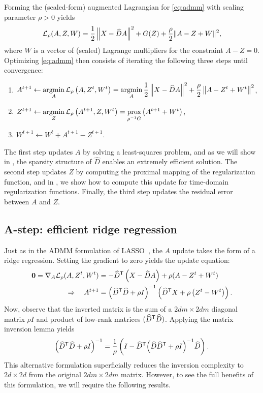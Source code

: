 \documentclass{article} %
\begin{document}
Forming the (scaled-form) augmented Lagrangian for \eqref{eq:admm} with scaling
parameter $\rho > 0 $ yields
\[
\mathcal{L}_\rho(A,Z,W) = \frac{1}{2}\left\|X - \widehat{D}A\right\|^2 + G(Z) +
\frac{\rho}{2}\|A - Z + W\|^2,
\]
where $W$ is a vector of (scaled) Lagrange multipliers for the constraint $A-Z=0$.
Optimizing \eqref{eq:admm} then consists of iterating the following three steps until
convergence:
\begin{enumerate}
\item $\displaystyle A^{t+1} \leftarrow \operatorname*{argmin}_A \mathcal{L}_\rho\left(A, Z^t, W^t\right) = \operatorname*{argmin}_A \frac{1}{2}
\left\|X - \widehat{D}A\right\|^2 + \frac{\rho}{2}\left\|A - Z^t + W^t\right\|^2$,
\item $\displaystyle Z^{t+1} \leftarrow \operatorname*{argmin}_Z \mathcal{L}_\rho\left(A^{t+1}, Z, W^t\right) =
\operatorname*{prox}_{\rho^{-1}G}\left(A^{t+1} + W^t \right)$,
\item $W^{t+1} \leftarrow W^t + A^{t+1} - Z^{t+1}$.
\end{enumerate}

The first step updates $A$ by solving a least-squares problem, and as we will show in
, the sparsity structure of $\widehat{D}$ enables an extremely
efficient solution.  The second step updates $Z$ by computing the proximal mapping of
the regularization function, and in , we show how to compute this
update for time-domain regularization functions.  Finally, the third step updates the
residual error between $A$ and $Z$.

\subsection{A-step: efficient ridge regression}
\label{sec:astep}
Just as in the ADMM formulation of LASSO~\cite[chapter 6.4]{boyd2011}, the $A$ update 
takes the form of a ridge regression.  Setting the gradient to zero yields the update
equation:
\begin{align}
\mathbf{0} = \nabla_A \mathcal{L}_\rho(A, Z^t, W^t) &= -\widehat{D}^\mathsf{T} \left(X - \widehat{D}A\right)
+ \rho(A - Z^t + W^t)\notag\\
\Rightarrow \quad A^{t+1} &= {\left(\widehat{D}^\mathsf{T} \widehat{D} + \rho I\right)}^{-1}
\left(\widehat{D}^\mathsf{T} X + \rho \left(Z^t - W^t\right)\right).\label{eq:a-update}
\end{align}
Now, observe that the inverted matrix is the sum of a $2dm\times 2dm$ diagonal matrix 
$\rho I$ and product of low-rank matrices $(\widehat{D}^\mathsf{T}\widehat{D})$.  
Applying the matrix inversion lemma yields
\begin{equation}
{\left(\widehat{D}\ensuremath{^\mathsf{T}}\widehat{D} + \rho I\right)}^{-1} = \frac{1}{\rho}\left( I -  \widehat{D}^\mathsf{T}
{\left(\widehat{D}\widehat{D}^\mathsf{T}  + \rho I \right)}^{-1}
\widehat{D}\right).\label{eq:inversion}
\end{equation}
This alternative formulation superficially reduces the inversion complexity to 
$2d\times 2d$ from the original $2dm\times 2dm$ matrix.  However, to see the full
benefits of this formulation, we will require the following results.
\end{document}
